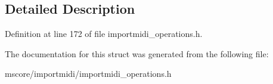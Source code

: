 \subsection{Detailed Description}


Definition at line 172 of file importmidi\+\_\+operations.\+h.



The documentation for this struct was generated from the following file\+:\begin{DoxyCompactItemize}
\item 
mscore/importmidi/importmidi\+\_\+operations.\+h\end{DoxyCompactItemize}
